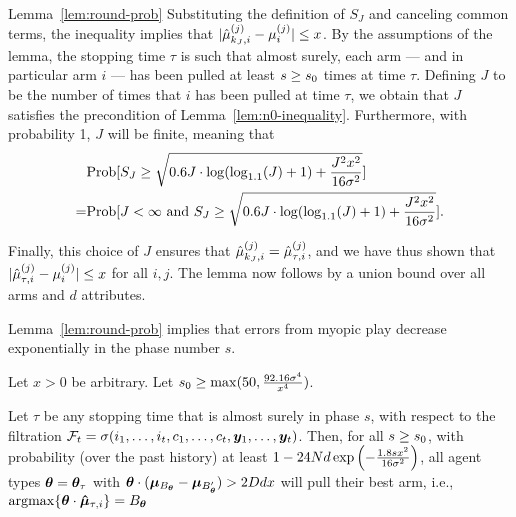\begin{extraproof}{Lemma~\ref{lem:round-prob}}
Substituting the definition of $S_J$ and canceling common terms,
the inequality implies that
$|\hat{\mu}_{k_J,i}^{(j)} - \mu_{i}^{(j)}| \leq x$.
By the assumptions of the lemma,
the stopping time $\tau$ is such that almost surely, each arm --- and
in particular arm $i$ --- has been pulled at least
$s \geq s_0$ times at time $\tau$.
Defining $J$ to be the number of times that $i$ has been pulled at
time $\tau$, we obtain that $J$ satisfies the precondition of
Lemma~\ref{lem:n0-inequality}.
Furthermore, with probability 1, $J$ will be finite, meaning that
\begin{align*}
& \Prob{S_J \geq 
\sqrt{0.6 J \cdot \log (\log_{1.1}(J) + 1) + \frac{J^2 x^2}{16
    \sigma^2}}}\\
= & \Prob{J < \infty \mbox{ and } S_J \geq 
\sqrt{0.6 J \cdot \log (\log_{1.1}(J) + 1) + \frac{J^2 x^2}{16
    \sigma^2}}}.
\end{align*}

Finally, this choice of $J$ ensures that
$\hat{\mu}_{k_J,i}^{(j)} = \hat{\mu}_{\tau,i}^{(j)}$,
and we have thus shown that
$|\hat{\mu}_{\tau,i}^{(j)} - \mu_{i}^{(j)}| \leq x$ for all $i,j$.
The lemma now follows by a union bound over all \ARMNUM arms and $d$
attributes.
\end{extraproof}


Lemma~\ref{lem:round-prob} implies that errors from myopic play
decrease exponentially in the phase number $s$.

\begin{corollary} \label{cor:right-choice}
Let $x > 0$ be arbitrary.
Let $s_0 \geq \max (50, \frac{92.16 \sigma^4}{x^4})$.

Let $\tau$ be any stopping time that is almost surely  in phase $s$,
with respect to the filtration
$\mathcal{F}_{t} = \sigma (i_{1}, \ldots, i_{t},
                          c_{1}, \ldots, c_{t},
                          \bm{y}_{1}, \ldots, \bm{y}_{t})$.
Then, for all $s \geq s_0$,
with probability (over the past history) at least 
$1 - 24 N d \exp\left(-\frac{1.8 s x^2}{16 \sigma^2} \right)$,
all agent types $\bm{\theta} = \bm{\theta}_{\tau}$ with
$\bm{\theta} \cdot (\bm{\mu}_{B_{\bm{\theta}}} - \bm{\mu}_{B'_{\bm{\theta}}}) > 2D d x$
will pull their best arm, i.e.,
$\mathop{\mathrm{argmax}} \{ \bm{\theta} \cdot \bm{\hat{\mu}}_{\tau,i} \} = B_{\bm{\theta}}$
\end{corollary}

